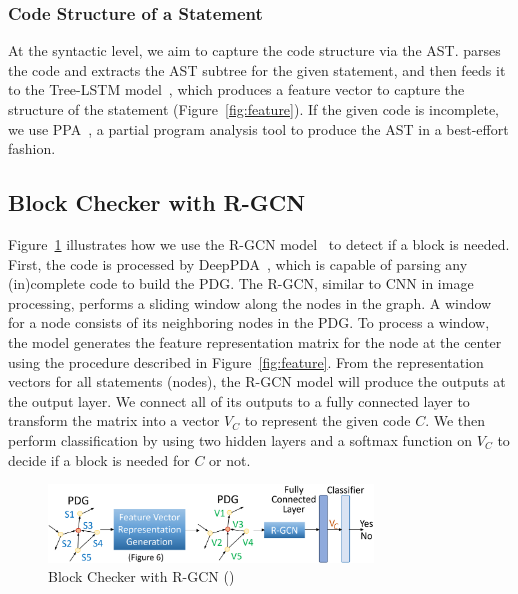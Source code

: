 \vspace{-1pt}
\subsubsection{Code Structure of a Statement}

At the syntactic level, we aim to capture the code structure via the
AST. {\tool} parses the code and extracts the AST subtree for the
given statement, and then feeds it to the Tree-LSTM
model~\cite{tai2015improved}, which produces a feature vector to
capture the structure of the statement (Figure~\ref{fig:feature}). If
the given code is incomplete, we use PPA~\cite{dagenais-oopsla08}, a
partial program analysis tool to produce the AST in a best-effort
fashion.


\subsection{ Block Checker with R-GCN}
\label{model:sec}



Figure~\ref{fig:gcn} illustrates how we use the R-GCN model~\cite{yi} to
detect if a  block is needed.
First, the code is processed by DeepPDA~\cite{icse23}, which is
capable of parsing any (in)complete code to build the PDG. The
R-GCN, similar to CNN in image processing, performs a sliding
window along the nodes in the graph. A window for a node consists of
its neighboring nodes in the PDG.
To process a window, the model generates the feature representation
matrix for the node at the center using the procedure described in
Figure~\ref{fig:feature}.
From the representation vectors for all statements (nodes), the R-GCN
model will produce the outputs at the output layer. We connect
all of its outputs to a fully connected layer to transform the matrix
into a vector $V_C$ to represent the given code $C$. We then perform
classification by using two hidden layers and a softmax function on
$V_C$ to decide if a  block is needed for
$C$ or not.

\begin{figure}[t]
	\centering
	\includegraphics[width=3.4in]{xblock-2.png}
	\caption{ Block Checker with R-GCN ({\xblock})}
	\label{fig:gcn}	
\end{figure}

